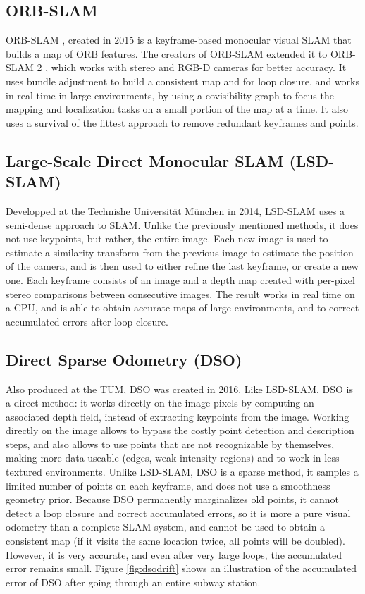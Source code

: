\subsection{ORB-SLAM}
ORB-SLAM \cite{orbslam}, created in 2015 is a keyframe-based monocular visual SLAM that builds a map of ORB features. The creators of ORB-SLAM extended it to ORB-SLAM 2 \cite{orbslam2}, which works with stereo and RGB-D cameras for better accuracy. It uses bundle adjustment to build a consistent map and for loop closure, and works in real time in large environments, by using a covisibility graph to focus the mapping and localization tasks on a small portion of the map at a time. It also uses a survival of the fittest approach to remove redundant keyframes and points.

\subsection{Large-Scale Direct Monocular SLAM (LSD-SLAM)}
Developped at the Technishe Universität München in 2014, LSD-SLAM \cite{lsdslam} uses a semi-dense approach to SLAM. Unlike the previously mentioned methods, it does not use keypoints, but rather, the entire image. Each new image is used to estimate a similarity transform from the previous image to estimate the position of the camera, and is then used to either refine the last keyframe, or create a new one. Each keyframe consists of an image and a depth map created with per-pixel stereo comparisons between consecutive images. The result works in real time on a CPU, and is able to obtain accurate maps of large environments, and to correct accumulated errors after loop closure.

\subsection{Direct Sparse Odometry (DSO)}
Also produced at the TUM, DSO \cite{dso} was created in 2016. Like LSD-SLAM, DSO is a direct method: it works directly on the image pixels by computing an associated depth field, instead of extracting keypoints from the image. Working directly on the image allows to bypass the costly point detection and description steps, and also allows to use points that are not recognizable by themselves, making more data useable (edges, weak intensity regions) and to work in less textured environments. Unlike LSD-SLAM, DSO is a sparse method, it samples a limited number of points on each keyframe, and does not use a smoothness geometry prior. Because DSO permanently marginalizes old points, it cannot detect a loop closure and correct accumulated errors, so it is more a pure visual odometry than a complete SLAM system, and cannot be used to obtain a consistent map (if it visits the same location twice, all points will be doubled). However, it is very accurate, and even after very large loops, the accumulated error remains small. Figure \ref{fig:dsodrift} shows an illustration of the accumulated error of DSO after going through an entire subway station.

